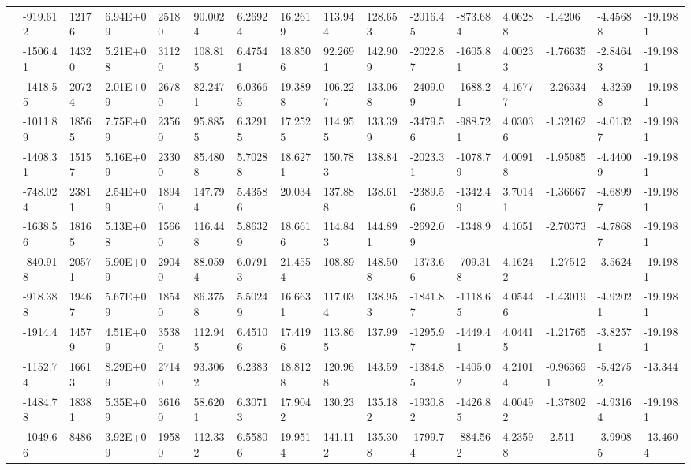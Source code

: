 \documentclass[paper=a4, fontsize=11pt]{scrartcl}
\numberwithin{equation}{section}
\numberwithin{figure}{section}
\numberwithin{table}{section}
\begin{document}
{{\begin{tabular}{l || l | l | l | l | l | l | l | l | l | l | l | l | l | l | l}
    & -919.612	& 12176	 & 6.94E+09	& 25180	 & 90.0024	& 6.26924	& 16.2619	& 113.944	& 128.653	& -2016.45	& -873.684	& 4.06288	& -1.4206	& -4.45688	& -19.1981 \\
    & -1506.41	& 14320	 & 5.21E+08	& 31120	 & 108.815	& 6.47541	& 18.8506	& 92.2691	& 142.909	& -2022.87	& -1605.81	& 4.00233	& -1.76635	& -2.84643	& -19.1981 \\
    & -1418.55	& 20724	 & 2.01E+09	& 26780	 & 82.2471	& 6.03665	& 19.3898	& 106.227	& 133.068	& -2409.09	& -1688.21	& 4.16777	& -2.26334	& -4.32598	& -19.1981 \\
    & -1011.89	& 18565	 & 7.75E+09	& 23560	 & 95.8855	& 6.32915	& 17.2525	& 114.955	& 133.399	& -3479.56	& -988.721	& 4.03036	& -1.32162	& -4.01327	& -19.1981 \\
    & -1408.31	& 15157	 & 5.16E+09	& 23300	 & 85.4808	& 5.70288	& 18.6271	& 150.783	& 138.84	& -2023.31	& -1078.79	& 4.00918	& -1.95085	& -4.44009	& -19.1981 \\
    & -748.024	& 23811	 & 2.54E+09	& 18940	 & 147.794	& 5.43586	& 20.034	& 137.888	& 138.61	& -2389.56	& -1342.49	& 3.70141	& -1.36667	& -4.68997	& -19.1981 \\
    & -1638.56	& 18165	 & 5.13E+08	& 15660	 & 116.448	& 5.86329	& 18.6616	& 114.843	& 144.891	& -2692.09	& -1348.9	& 4.1051	& -2.70373	& -4.78687	& -19.1981 \\
    & -840.918	& 20571	 & 5.90E+09	& 29040	 & 88.0594	& 6.07913	& 21.4554	& 108.89	& 148.508	& -1373.66	& -709.318	& 4.16242	& -1.27512	& -3.5624	& -19.1981 \\
    & -918.388	& 19467	 & 5.67E+09	& 18540	 & 86.3758	& 5.50249	& 16.6631	& 117.034	& 138.953	& -1841.87	& -1118.65	& 4.05446	& -1.43019	& -4.92021	& -19.1981 \\
    & -1914.4	& 14579	 & 4.51E+09	& 35380	 & 112.945	& 6.45106	& 17.4196	& 113.865	& 137.99	& -1295.97	& -1449.41	& 4.04415	& -1.21765	& -3.82571	& -19.1981 \\
    & -1152.74	& 16613	 & 8.29E+09	& 27140	 & 93.3062	& 6.2383	& 18.8128	& 120.968	& 143.59	& -1384.85	& -1405.02	& 4.21014	& -0.963691	& -5.42752	& -13.344  \\
    & -1484.78	& 18381	 & 5.35E+09	& 36160	 & 58.6201	& 6.30713	& 17.9042	& 130.23	& 135.182	& -1930.82	& -1426.85	& 4.00492	& -1.37802	& -4.93164	& -19.1981 \\
    & -1049.66	& 8486	 & 3.92E+09	& 19580	 & 112.332	& 6.55806	& 19.9514	& 141.112	& 135.308	& -1799.74	& -884.562	& 4.23598	& -2.511	& -3.99085	& -13.4604 \\

\end{tabular}}}
\end{document}
